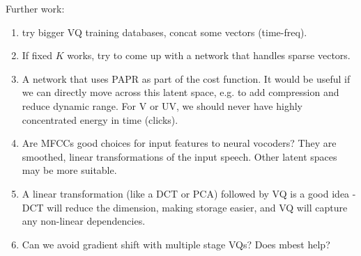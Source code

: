 \documentclass{article}
\begin{document}
Further work:
\begin{enumerate}
\item try bigger VQ training databases, concat some vectors (time-freq).
\item If fixed $K$ works, try to come up with a network that handles sparse vectors.
\item A network that uses PAPR as part of the cost function.  It would be useful if we can directly move across this latent space, e.g. to add compression and reduce dynamic range.  For V or UV, we should never have highly concentrated energy in time (clicks).
\item Are MFCCs good choices for input features to neural vocoders? They are smoothed, linear transformations of the input speech.  Other latent spaces may be more suitable.
\item A linear transformation (like a DCT or PCA) followed by VQ is a good idea - DCT will reduce the dimension, making storage easier, and VQ will capture any non-linear dependencies.
\item Can we avoid gradient shift with multiple stage VQs?  Does mbest help?
\end{enumerate}



\end{document}
